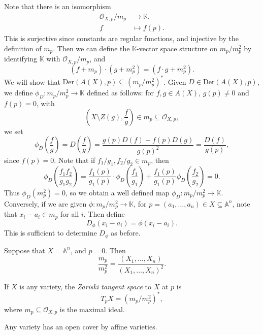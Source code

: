 \documentclass[12pt]{article}
\begin{document}
\begin{proofbox}
	Note that there is an isomorphism
	\begin{align*}
		\mathcal{O}_{X, p} / m_p &\to \mathbb{K}, \\
		f &\mapsto f(p).
	\end{align*}
	This is surjective since constants are regular functions, and injective by the definition of $m_p$. Then we can define the $\mathbb{K}$-vector space structure on $m_p / m_p^2$ by identifying $\mathbb{K}$ with $\mathcal{O}_{X,p} / m_p$, and
	\[
		(f + m_p) \cdot (g + m_p^2) = (f \cdot g + m_p^2).
	\]
	We will show that $\mathrm{Der}(A(X), p) \subseteq (m_p/ m_p^2)^\ast$. Given $D \in \mathrm{Der}(A(X), p)$, we define $\phi_D : m_p / m_p^2 \to \mathbb{K}$ defined as follows: for $f, g \in A(X)$, $g(p) \neq 0$ and $f(p) = 0$, with
	\[
		\left( X \setminus Z(g), \frac{f}{g} \right) \in m_p \subseteq \mathcal{O}_{X, p},
	\]
	we set
	\[
	\phi_D \left( \frac{f}{g} \right) = D \left( \frac{f}{g} \right) = \frac{g(p) D(f) - f(p) D(g)}{g(p)^2} = \frac{D(f)}{g(p)},
	\]
	since $f(p) = 0$. Note that if $f_1/g_1, f_2/g_2 \in m_p$, then
	\[
	\phi_D \left( \frac{f_1 f_2}{g_1 g_2} \right) = \frac{f_1(p)}{g_1(p)} \cdot \phi_D \left( \frac{f_1}{g_1} \right) + \frac{f_1(p)}{g_1(p)} \phi_D \left( \frac{f_2}{g_2} \right) = 0.
	\]
	Thus $\phi_D (m_p^2) = 0$, so we obtain a well defined map $\phi_D : m_p/m_p^2 \to \mathbb{K}$. Conversely, if we are given $\phi : m_p /m_p^2 \to \mathbb{K}$, for $p = (a_1, \ldots, a_n) \in X \subseteq \mathbb{A}^n$, note that $x_i - a_i \in m_p$ for all $i$. Then define
	\[
	D_\phi(x_i - a_i) = \phi(x_i - a_i).
	\]
	This is sufficient to determine $D_\phi$ as before.
\end{proofbox}

\begin{exbox}
	Suppose that $X = \mathbb{A}^n$, and $p = 0$. Then
	\[
		\frac{m_p}{m_p^2} = \frac{(X_1, \ldots, X_n)}{(X_1, \ldots, X_n)^2}.
	\]
\end{exbox}

\begin{definition}
	If $X$ is any variety, the \emph{Zariski tangent space} to $X$ at $p$ is
	\[
	T_p X = (m_p/m_p^2)^\ast,
	\]
	where $m_p \subseteq \mathcal{O}_{X, p}$ is the maximal ideal.
\end{definition}

\begin{theorem}
	Any variety has an open cover by affine varieties.
\end{theorem}
\end{document}
